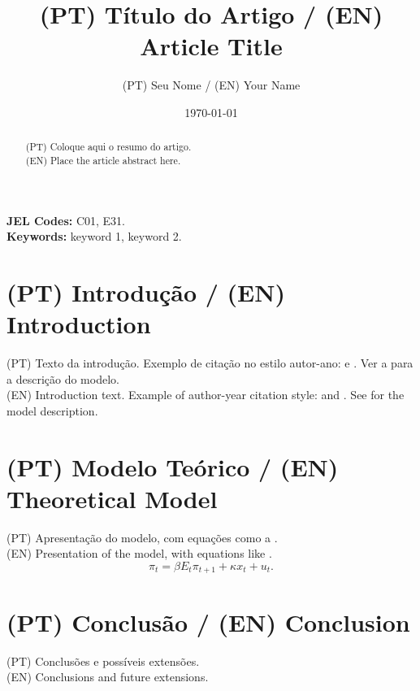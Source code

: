 \documentclass[12pt,a4paper]{article}
\title{(PT) Título do Artigo / (EN) Article Title}
\author{(PT) Seu Nome / (EN) Your Name}
\date{\today}
\begin{document}
\maketitle

\begin{abstract}
    (PT) Coloque aqui o resumo do artigo. \\
    (EN) Place the article abstract here.
\end{abstract}

\noindent \textbf{JEL Codes:} C01, E31. \\
\textbf{Keywords:} keyword 1, keyword 2.


\section{(PT) Introdução / (EN) Introduction}
(PT) Texto da introdução. Exemplo de citação no estilo autor-ano: \citet{lucas1976} e \citep{barro1979}. Ver a  para a descrição do modelo. \\
(EN) Introduction text. Example of author-year citation style: \citet{lucas1976} and \citep{barro1979}. See  for the model description.

\section{(PT) Modelo Teórico / (EN) Theoretical Model}
\label{sec:modelo}
(PT) Apresentação do modelo, com equações como a . \\
(EN) Presentation of the model, with equations like .
\begin{equation}
  \label{eq:curva_phillips}
  \pi_t = \beta E_t \pi_{t+1} + \kappa x_t + u_t.
\end{equation}

\section{(PT) Conclusão / (EN) Conclusion}
(PT) Conclusões e possíveis extensões. \\
(EN) Conclusions and future extensions.


\printbibliography
\end{document}

